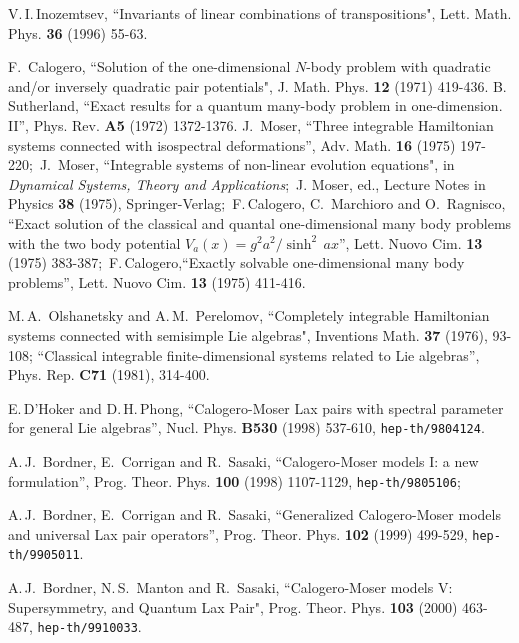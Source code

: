 \documentclass[a4paper,12pt]{article}
\begin{document}
\begin{thebibliography}{99}
V.\,I.\,Inozemtsev, ``Invariants of linear combinations of transpositions",
Lett. Math. Phys. {\bf 36} (1996) 55-63.

  F.\, Calogero, ``Solution of the one-dimensional
\(N\)-body problem with quadratic and/or inversely quadratic pair
potentials", J. Math. Phys. {\bf 12} (1971) 419-436.
B.\, Sutherland, ``Exact results for a quantum many-body problem in
one-dimension. II'', Phys. Rev. {\bf A5} (1972) 1372-1376.
J.\, Moser, ``Three integrable Hamiltonian systems connected with
isospectral deformations'',  Adv. Math. {\bf 16} (1975) 197-220;\
J.\, Moser,  ``Integrable systems of non-linear evolution equations",
in {\it Dynamical Systems, Theory and Applications\/};\
J. Moser, ed., Lecture Notes in Physics {\bf 38} (1975),
Springer-Verlag;\
F.\,Calogero, C.\, Marchioro and O.\, Ragnisco, ``Exact solution of the
classical and quantal one-dimensional many body problems with
the two body potential \(V_{a}(x)=g^2a^2/\sinh^2\,ax\)'', Lett. Nuovo
Cim. {\bf 13} (1975) 383-387;\
F.\,Calogero,``Exactly solvable one-dimensional many body problems'',
Lett. Nuovo Cim. {\bf 13} (1975) 411-416.


\bibitem{OP1} M.\,A.\, Olshanetsky and A.\,M.\, Perelomov,
``Completely integrable Hamiltonian systems connected with
 semisimple Lie algebras",
 Inventions Math. {\bf 37} (1976), 93-108;
 ``Classical integrable finite-dimensional systems related to Lie
 algebras'',
 Phys. Rep.  {\bf C71} (1981), 314-400.

 \bibitem{DHoker_Phong}
E.\,D'Hoker and D.\,H.\,Phong, ``Calogero-Moser
Lax pairs with spectral parameter for general Lie algebras'',
Nucl. Phys. {\bf B530} (1998) 537-610, {\tt hep-th/9804124}.




 A.\,J.\, Bordner, E.\, Corrigan and R.\, Sasaki,
``Calogero-Moser models I: a new formulation'',
Prog. Theor. Phys. {\bf 100} (1998) 1107-1129, {\tt hep-th/9805106};


 \bibitem{bcs2}  A.\,J.\, Bordner, E.\, Corrigan and R.\, Sasaki,
``Generalized Calogero-Moser models and  universal Lax pair operators'',
 Prog. Theor. Phys. {\bf 102}  (1999)  499-529,
 {\tt  hep-th/9905011}.



  A.\,J.\, Bordner, N.\,S.\, Manton and R.\, Sasaki,
``Calogero-Moser models V:  Supersymmetry,
and Quantum Lax Pair", Prog. Theor. Phys. {\bf 103} (2000) 463-487,
{\tt hep-th/9910033}.



\end{thebibliography}
\end{document}

